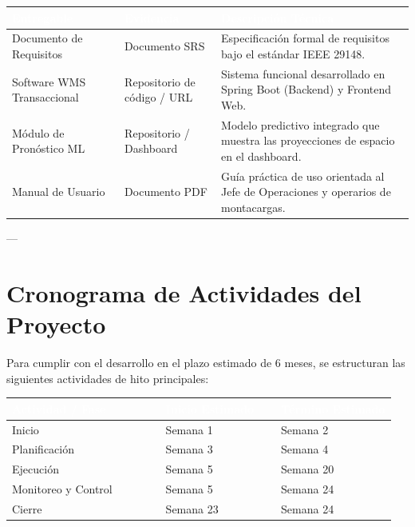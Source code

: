 \documentclass[11pt]{article}
\newcounter{none} %
\begin{document}
\vspace{0.3cm}
\setlength{\tabcolsep}{5pt}
\renewcommand{\arraystretch}{1.5}
{\def\LTcaptype{none}
\begin{longtable}[]{@{}
  >{\raggedright\arraybackslash}p{0.28\linewidth}
  >{\raggedright\arraybackslash}p{0.24\linewidth}
  >{\raggedright\arraybackslash}p{0.48\linewidth}@{}}
\rowcolor{DeepNavy}
\textcolor{white}{\textbf{Entregable}} & \textcolor{white}{\textbf{Evidencia}} & \textcolor{white}{\textbf{Descripción Técnica}} \\ \hline
\endhead
\rowcolor{LightGray}
Documento de Requisitos & Documento SRS & Especificación formal de requisitos bajo el estándar IEEE 29148. \\ \hline
Software WMS Transaccional & Repositorio de código / URL & Sistema funcional desarrollado en Spring Boot (Backend) y Frontend Web. \\ \hline
\rowcolor{LightGray}
Módulo de Pronóstico ML & Repositorio / Dashboard & Modelo predictivo integrado que muestra las proyecciones de espacio en el dashboard. \\ \hline
Manual de Usuario & Documento PDF & Guía práctica de uso orientada al Jefe de Operaciones y operarios de montacargas. \\ \hline
\end{longtable}
}

---

\section{Cronograma de Actividades del Proyecto}

Para cumplir con el desarrollo en el plazo estimado de 6 meses, se estructuran las siguientes actividades de hito principales:

\vspace{0.3cm}
\setlength{\tabcolsep}{6pt}
\renewcommand{\arraystretch}{1.5}
{\def\LTcaptype{none}
\begin{longtable}[]{@{}
  >{\raggedright\arraybackslash}p{0.40\linewidth}
  >{\centering\arraybackslash}p{0.30\linewidth}
  >{\centering\arraybackslash}p{0.30\linewidth}@{}}
\rowcolor{DeepNavy}
\textcolor{white}{\textbf{Actividad / Fase}} & \textcolor{white}{\textbf{Inicio Estimado}} & \textcolor{white}{\textbf{Término Estimado}} \\ \hline
\endhead
\rowcolor{LightGray}
Inicio & Semana 1 & Semana 2 \\ \hline
Planificación & Semana 3 & Semana 4 \\ \hline
\rowcolor{LightGray}
Ejecución & Semana 5 & Semana 20 \\ \hline
Monitoreo y Control & Semana 5 & Semana 24 \\ \hline
\rowcolor{LightGray}
Cierre & Semana 23 & Semana 24 \\ \hline
\end{longtable}
}
\end{document}
